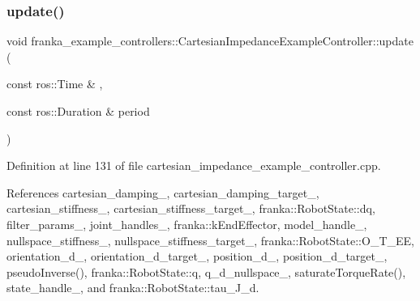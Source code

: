 \mbox{\label{classfranka__example__controllers_1_1CartesianImpedanceExampleController_ab7e3690c65dbf1ff57a5d37cb651cd04}} 
\subsubsection{\texorpdfstring{update()}{update()}}
{\footnotesize\ttfamily void franka\+\_\+example\+\_\+controllers\+::\+Cartesian\+Impedance\+Example\+Controller\+::update (\begin{DoxyParamCaption}\item[{const ros\+::\+Time \&}]{,  }\item[{const ros\+::\+Duration \&}]{period }\end{DoxyParamCaption})\hspace{0.3cm}{\ttfamily [override]}}



Definition at line 131 of file cartesian\+\_\+impedance\+\_\+example\+\_\+controller.\+cpp.



References cartesian\+\_\+damping\+\_\+, cartesian\+\_\+damping\+\_\+target\+\_\+, cartesian\+\_\+stiffness\+\_\+, cartesian\+\_\+stiffness\+\_\+target\+\_\+, franka\+::\+Robot\+State\+::dq, filter\+\_\+params\+\_\+, joint\+\_\+handles\+\_\+, franka\+::k\+End\+Effector, model\+\_\+handle\+\_\+, nullspace\+\_\+stiffness\+\_\+, nullspace\+\_\+stiffness\+\_\+target\+\_\+, franka\+::\+Robot\+State\+::\+O\+\_\+\+T\+\_\+\+EE, orientation\+\_\+d\+\_\+, orientation\+\_\+d\+\_\+target\+\_\+, position\+\_\+d\+\_\+, position\+\_\+d\+\_\+target\+\_\+, pseudo\+Inverse(), franka\+::\+Robot\+State\+::q, q\+\_\+d\+\_\+nullspace\+\_\+, saturate\+Torque\+Rate(), state\+\_\+handle\+\_\+, and franka\+::\+Robot\+State\+::tau\+\_\+\+J\+\_\+d.


